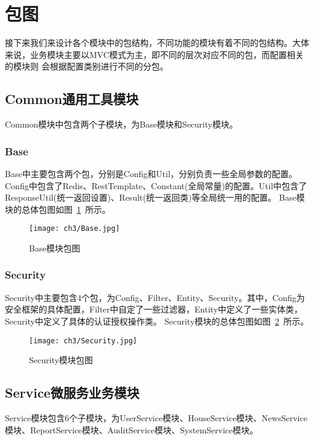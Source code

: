 \section{包图}
接下来我们来设计各个模块中的包结构，不同功能的模块有着不同的包结构。大体来说，业务模块主要以MVC模式为主，即不同的层次对应不同的包，而配置相关的模块则
会根据配置类别进行不同的分包。

\subsection{Common通用工具模块}
Common模块中包含两个子模块，为Base模块和Security模块。
\subsubsection{Base}
Base中主要包含两个包，分别是Config和Util，分别负责一些全局参数的配置。Config中包含了Redis、RestTemplate、Constant(全局常量)的配置。Util中包含了ResponseUtil(统一返回设置)、Result(统一返回类)等全局统一用的配置。
Base模块的总体包图如图~\ref{fig:Base}~所示。
\begin{figure}[htbp]
    \centering
    \texttt{[image: ch3/Base.jpg]}
    \caption{Base模块包图}\label{fig:Base}
    \vspace{\baselineskip} %
\end{figure}

\subsubsection{Security}
Security中主要包含4个包，为Config、Filter、Entity、Security。其中，Config为安全框架的具体配置，Filter中自定了一些过滤器，Entity中定义了一些实体类，Security中定义了具体的认证授权操作类。
Security模块的总体包图如图~\ref{fig:Security}~所示。
\begin{figure}[htbp]
    \centering
    \texttt{[image: ch3/Security.jpg]}
    \caption{Security模块包图}\label{fig:Security}
    \vspace{\baselineskip} %
\end{figure}

\subsection{Service微服务业务模块}
Service模块包含6个子模块，为UserService模块、HouseService模块、NewsService模块、ReportService模块、AuditService模块、SystemService模块。

